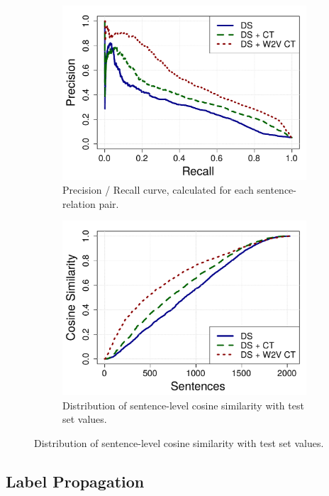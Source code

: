 \begin{figure}[tbh!]
\centering
\begin{subfigure}{.5\textwidth}
\caption{Precision / Recall curve, calculated for each sentence-relation pair.}
\label{fig:pr}
\includegraphics[width=\linewidth]{img/pr.pdf}
\end{subfigure}%
\begin{subfigure}{.5\textwidth}
\caption{Distribution of sentence-level cosine similarity with test set values.}
\label{fig:cos_sim}
\includegraphics[width=\linewidth]{img/cos_sim.pdf}
\end{subfigure}
\end{figure}


\subsection{Label Propagation}

